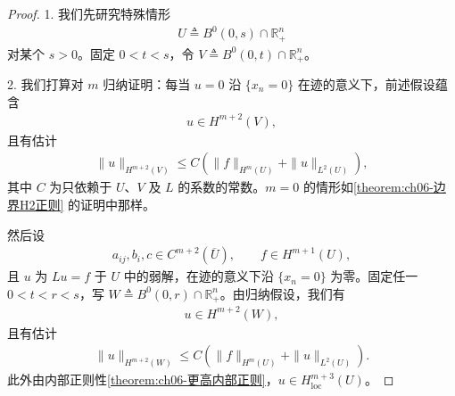 \documentclass[../../main.tex]{subfiles}
\begin{document}
\begin{proof}
1. 我们先研究特殊情形
\begin{align}
U\triangleq B^{0}(0,s)\cap\mathbb{R}^{n}_{+}
\end{align}
对某个 $s>0$。固定 $0<t<s$，令 $V\triangleq B^{0}(0,t)\cap\mathbb{R}^{n}_{+}$。

2. 我们打算对 $m$ 归纳证明：每当 $u=0$ 沿 $\{x_{n}=0\}$ 在迹的意义下，前述假设蕴含
\begin{align}
u\in H^{m+2}(V),
\end{align}
且有估计
\begin{align}
\|u\|_{H^{m+2}(V)}\leqslant C(\|f\|_{H^{m}(U)}+\|u\|_{L^{2}(U)}),
\end{align}
其中 $C$ 为只依赖于 $U$、$V$ 及 $L$ 的系数的常数。$m=0$ 的情形如\cref{theorem:ch06-边界H2正则} 的证明中那样。

然后设
\begin{align}
a_{ij},b_{i},c\in C^{m+2}(\overline{U}),\qquad f\in H^{m+1}(U),
\end{align}
且 $u$ 为 $Lu=f$ 于 $U$ 中的弱解，在迹的意义下沿 $\{x_{n}=0\}$ 为零。固定任一 $0<t<r<s$，写 $W\triangleq B^{0}(0,r)\cap\mathbb{R}^{n}_{+}$。由归纳假设，我们有
\begin{align}
u\in H^{m+2}(W),
\end{align}
且有估计
\begin{align}
\|u\|_{H^{m+2}(W)}\leqslant C(\|f\|_{H^{m}(U)}+\|u\|_{L^{2}(U)}).
\end{align}
此外由内部正则性\cref{theorem:ch06-更高内部正则}，$u\in H^{m+3}_{\mathrm{loc}}(U)$。


\end{proof}
\end{document}
